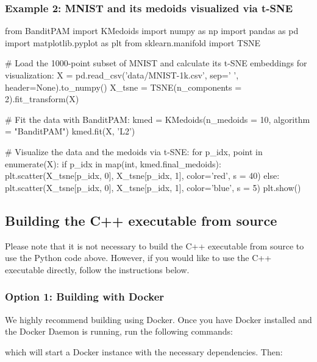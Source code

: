 \subsubsection*{Example 2\+: M\+N\+I\+ST and its medoids visualized via t-\/\+S\+NE}


\begin{DoxyCode}
from BanditPAM import KMedoids
import numpy as np
import pandas as pd
import matplotlib.pyplot as plt
from sklearn.manifold import TSNE

# Load the 1000-point subset of MNIST and calculate its t-SNE embeddings for visualization:
X = pd.read\_csv('data/MNIST-1k.csv', sep=' ', header=None).to\_numpy()
X\_tsne = TSNE(n\_components = 2).fit\_transform(X)

# Fit the data with BanditPAM:
kmed = KMedoids(n\_medoids = 10, algorithm = "BanditPAM")
kmed.fit(X, 'L2')

# Visualize the data and the medoids via t-SNE:
for p\_idx, point in enumerate(X):
    if p\_idx in map(int, kmed.final\_medoids):
        plt.scatter(X\_tsne[p\_idx, 0], X\_tsne[p\_idx, 1], color='red', s = 40)
    else:
        plt.scatter(X\_tsne[p\_idx, 0], X\_tsne[p\_idx, 1], color='blue', s = 5)
plt.show()
\end{DoxyCode}


\subsection*{Building the C++ executable from source}

Please note that it is not necessary to build the C++ executable from source to use the Python code above. However, if you would like to use the C++ executable directly, follow the instructions below.

\subsubsection*{Option 1\+: Building with Docker}

We highly recommend building using Docker. Once you have Docker installed and the Docker Daemon is running, run the following commands\+:




which will start a Docker instance with the necessary dependencies. Then\+:


